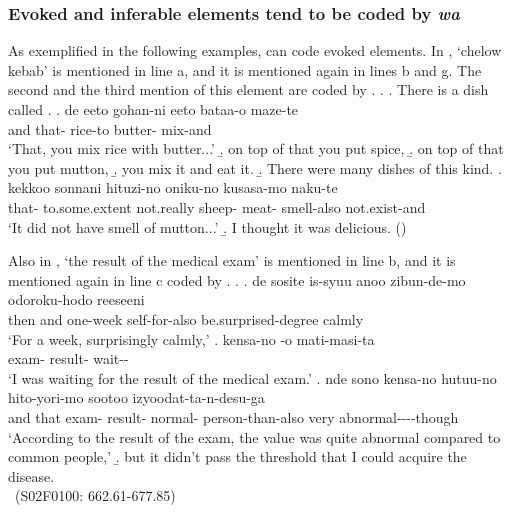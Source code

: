 \subsubsection{Evoked and inferable elements tend to be coded by \textit{wa}}

As exemplified in the following examples,
 can code evoked elements.
In \Next,
`chelow kebab' is mentioned in line a,
and it is mentioned again in lines b and g.
The second and the third mention of this element are coded by .
%
\ex.\label{kebab}
 \a. There is a dish called .
 \bg. de  eeto gohan-ni eeto bataa-o maze-te \\
 	and that-  rice-to  butter- mix-and \\
	`That, you mix rice with butter...'
 \b. on top of that you put spice,
 \b. on top of that you put mutton,
 \b. you mix it and eat it.
 \b. There were many dishes of this kind.
 \bg.  kekkoo sonnani hituzi-no oniku-no kusasa-mo naku-te \\
 	that- to.some.extent not.really sheep- meat- smell-also not.exist-and \\
	`It did not have smell of mutton...'
 \b. I thought it was delicious.
 \hfill{()}

Also in \Next,
`the result of the medical exam' is mentioned in line b,
and it is mentioned again in line c coded by .
%
\ex.\label{kensakekka}
 \ag. de sosite is-syuu anoo zibun-de-mo odoroku-hodo reeseeni \\
 	then and one-week  self-for-also be.surprised-degree calmly \\
	`For a week, surprisingly calmly,'
 \bg. kensa-no -o mati-masi-ta \\
 	exam- result- wait-- \\
	`I was waiting for the result of the medical exam.'
 \bg. nde sono kensa-no  hutuu-no hito-yori-mo sootoo izyoodat-ta-n-desu-ga \\
 	and that exam- result- normal- person-than-also very abnormal----though \\
 	`According to the result of the exam, the value was quite abnormal compared to common people,'
 \b. but it didn't pass the threshold that I could acquire the disease.\\
 ~\hfill{(S02F0100: 662.61-677.85)}


